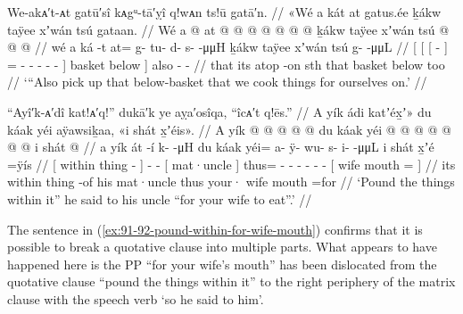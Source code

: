 \ex\label{ex:91-91-pick-up-cooking-basket}%
%
\begingl
	\glpreamble	We-akᴀ′t-ᴀt gatū′sî kᴀgᵘ-tā′ỵî q!wᴀn ts!ū gatā′n. //
	\glpreamble	«\!Wé a kát at gatus.ée ḵákw taÿee xʼwán tsú gataan. //
	\gla	{} Wé {} {} a  @ {} {}
				at @  @ {} @ {} @ {} @ {} @ {} @ {} {} 
			ḵákw taÿee {} xʼwán tsú 
		 @ {} @ {} @ {} //
	\glb	{} wé {} {} a ká -t {}
				at= g- tu- d- s-  -μμH {} {}
			ḵákw taÿee {} xʼwán tsú
		g- {}  -μμL //
	\glc	{}[  {}[ {}[   - {}]
				= - - - -  - \· {}]
			basket below {}]  also
		- \·  - //
	\gld	{} that {} {} its atop -on {}
				sth\•  {} {} {} {} {} \·that {}
			basket below {}  too
		 {} {} {} //
	\glft	‘“Also pick up that below-basket that we cook things for ourselves on.’
		//
\endgl
\xe

\ex\label{ex:91-92-pound-within-for-wife-mouth}%
%
\begingl
	\glpreamble	“Ayî′k-ᴀ′dî kat!ᴀ′q!” dukā′k ye aỵa′osîqa, “îcᴀ′t q!ēs.” //
	\glpreamble	A yík ádi katʼéx̱ʼ\!» du káak yéi aÿawsiḵaa, «\!i shát x̱ʼéis\!». //
	\gla	{} A yík  @ {} {}  @ {} @ {} @ {} @ {}
		{} du káak {} yéi @  @ {} @ {} @ {} @ {} @ {} @ {}
		{} i shát  @ {} {} //
	\glb	{} a yík át -í {} k- {} {}  -μH
		{} du káak {} yéi= a- ÿ- wu- s- i-  -μμL
		{} i shát x̱ʼé =ÿís {} //
	\glc	{}[  within thing - {}] - \· \·  -
		{}[  mat·uncle {}] thus= - - - - -
			 -
		{}[  wife mouth = {}] //
	\gld	{} its within thing -of {}  {} {} {} {}
		{} his mat·uncle {} thus  {} {} {} {} {} {}
		{} your· wife mouth =for {} //
	\glft	‘Pound the things within it” he said to his uncle “for your wife to eat”.’
		//
\endgl
\xe

The sentence in (\ref{ex:91-92-pound-within-for-wife-mouth}) confirms that it is possible to break a quotative clause into multiple parts.
What appears to have happened here is the PP  “for your wife’s mouth” has been dislocated from the quotative clause  “pound the things within it” to the right periphery of the matrix clause with the speech verb  ‘so he said to him’.

